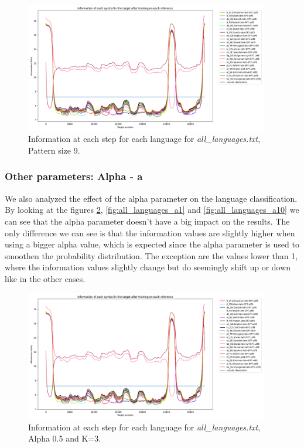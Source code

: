 \documentclass{article}
\begin{document}
\begin{figure}
    \centering
    \includegraphics[width=0.95\textwidth]{../results/all_languages/-k_9_-a_1.png}
    \caption{Information at each step for each language for \textit{all\_languages.txt}, Pattern size 9.}
    \label{fig:all_languages_k_9}
\end{figure}


\subsubsection{Other parameters: Alpha - a}
\label{subsubsec:results_locate_lang_alpha}

We also analyzed the effect of the alpha parameter on the language classification.
By looking at the figures \ref{fig:all_languages_a0.5}, \ref{fig:all_languages_a1} and \ref{fig:all_languages_a10} we can see that the alpha parameter doesn't have a big impact on the results.
The only difference we can see is that the information values are slightly higher when using a bigger alpha value, which is expected since the alpha parameter is used to smoothen the probability distribution.
The exception are the values lower than 1, where the information values slightly change but do seemingly shift up or down like in the other cases.

\begin{figure}
    \centering
    \includegraphics[width=0.95\textwidth]{../results/all_languages/-k_3_-a_0.5.png}
    \caption{Information at each step for each language for \textit{all\_languages.txt}, Alpha 0.5 and K=3.}
    \label{fig:all_languages_a0.5}
\end{figure}
\end{document}
